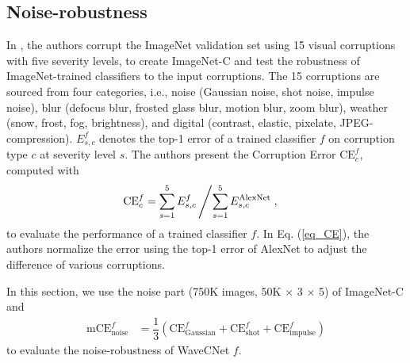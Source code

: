 \documentclass[10pt,twocolumn,letterpaper]{article}
\begin{document}
\subsection{Noise-robustness}
In \cite{hendrycks2019benchmarking},
the authors corrupt the ImageNet validation set using 15 visual corruptions with five severity levels,
to create ImageNet-C and test the robustness of ImageNet-trained classifiers to the input corruptions.
The 15 corruptions are sourced from four categories,
i.e., noise (Gaussian noise, shot noise, impulse noise),
blur (defocus blur, frosted glass blur, motion blur, zoom blur),
weather (snow, frost, fog, brightness), and digital (contrast, elastic, pixelate, JPEG-compression).
$E_{s,c}^f$ denotes the top-1 error of a trained classifier $f$ on corruption type $c$ at severity level $s$.
The authors present the Corruption Error $\text{CE}_c^f$, computed with
\begin{align}
\label{eq_CE}
\text{CE}_c^f &= \sum_{s=1}^5 E_{s,c}^f\left/\sum_{s=1}^5 E_{s,c}^{\text{AlexNet}}\right.,
\end{align}
to evaluate the performance of a trained classifier $f$.
In Eq. (\ref{eq_CE}), the authors normalize the error using the top-1 error of AlexNet \cite{krizhevsky2012imagenet}
to adjust the difference of various corruptions.

In this section, we use the noise part (750K images, 50K $\times$ 3 $\times$ 5) of ImageNet-C
and
\begin{align}
\label{eq_mCE_noise}
\text{mCE}_{\text{noise}}^f &= \dfrac{1}{3}\left(\text{CE}_{\text{Gaussian}}^f
+ \text{CE}_{\text{shot}}^f + \text{CE}_{\text{impulse}}^f\right)
\end{align}
to evaluate the noise-robustness of WaveCNet $f$.
\end{document}
